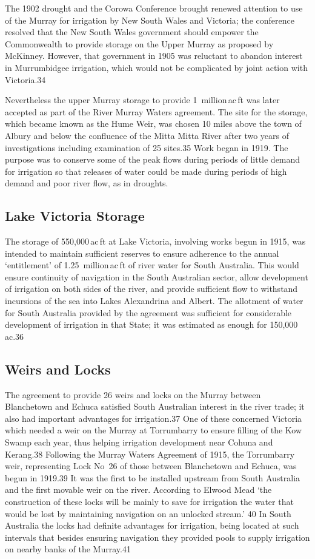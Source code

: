 The 1902 drought and the Corowa Conference brought renewed attention
to use of the Murray for irrigation by New South Wales and Victoria;
the conference resolved that the New South Wales government should
empower the Commonwealth to provide storage on the Upper Murray as
proposed by McKinney.  However, that government in 1905 was reluctant
to abandon interest in Murrumbidgee irrigation, which would not be
complicated by joint action with Victoria.34

Nevertheless the upper Murray storage to provide 1~million\,ac\,ft was
later accepted as part of the River Murray Waters agreement. The site
for the storage, which became known as the Hume Weir, was chosen 10
miles above the town of Albury and below the confluence of the Mitta
Mitta River after two years of investigations including examination of
25 sites.35 Work began in 1919.  The purpose was to conserve some of
the peak flows during periods of little demand for irrigation so that
releases of water could be made during periods of high demand and poor
river flow, as in droughts.

\subsection{Lake Victoria Storage}

The storage of 550,000\,ac\,ft at Lake Victoria, involving works begun
in 1915, was intended to maintain sufficient reserves to ensure
adherence to the annual `entitlement' of 1.25~million\,ac\,ft of river
water for South Australia.  This would ensure continuity of navigation
in the South Australian sector, allow development of irrigation on
both sides of the river, and provide sufficient flow to withstand
incursions of the sea into Lakes Alexandrina and Albert.  The
allotment of water for South Australia provided by the agreement was
sufficient for considerable development of irrigation in that State;
it was estimated as enough for 150,000\,ac.36

\subsection{Weirs and Locks}

The agreement to provide 26 weirs and locks on the Murray between
Blanchetown and Echuca satisfied South Australian interest in the
river trade; it also had important advantages for irrigation.37 One of
these concerned Victoria which needed a weir on the Murray at
Torrumbarry to ensure filling of the Kow Swamp each year, thus helping
irrigation development near Cohuna and Kerang.38 Following the Murray
Waters Agreement of 1915, the Torrumbarry weir, representing Lock
No~26 of those between Blanchetown and Echuca, was begun in 1919.39 It
was the first to be installed upstream from South Australia and the
first movable weir on the river.  According to Elwood Mead `the
construction of these locks will be mainly to save for irrigation the
water that would be lost by maintaining navigation on an unlocked
stream.' 40 In South Australia the locks had definite advantages for
irrigation, being located at such intervals that besides ensuring
navigation they provided pools to supply irrigation on nearby banks of
the Murray.41

